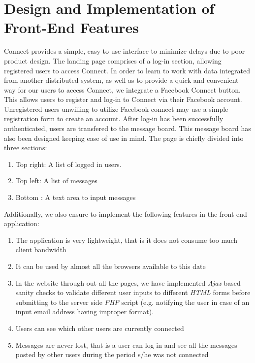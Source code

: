 \documentclass[12pt]{article}
\begin{document}
\section {Design and Implementation of Front-End Features} 
Connect provides a simple, easy to use interface to minimize delays due to poor product design. 
The landing page comprises of a log-in section, allowing registered users to access Connect. In
order to learn to work with data integrated from another distributed
system, as well as to provide a quick and convenient way for our users to access
Connect, we integrate a Facebook Connect button. This allows users to register
and log-in to Connect via their Facebook account. Unregistered users unwilling
to utilize Facebook connect may use a simple registration form to create an
account.  After log-in has been successfully authenticated, users are transfered
to the message board. This message board has also been designed keeping ease of
use in mind. The page is chiefly divided into three sections: 
\begin{enumerate}
\item Top right: A list of logged in users.  
\item Top left: A list of messages
\item Bottom : A text area to input messages 
\end{enumerate} 
Additionally, we also ensure to implement the following features in the front end application: 
\begin{enumerate}
\item The application is very lightweight, that is it does not consume too much client bandwidth
\item It can be used by almost all the browsers available to this date
\item In the website through out all the pages, we have implemented \emph{Ajax} based sanity checks to validate different user inputs to different \emph{HTML} forms before submitting to the server side \emph{PHP} script (e.g. notifying the user in case of an input email address having improper format).
\item Users can see which other users are currently connected
\item Messages are never lost, that is a user can log in and see all the messages posted by 
other users during the period s/he was not connected
\end{enumerate}
\end{document}
